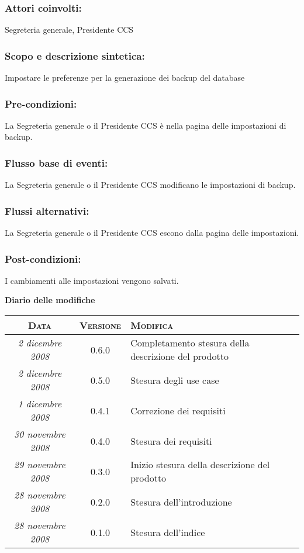 \documentclass[11pt,a4paper]{article}
\newcommand{\modifiche} 
{
\newpage
\begin{center}
\textbf{Diario delle modifiche} \\
\bigskip
\begin{tabular}{|c|c|p{0.51\textwidth}|}
\hline
\textsc{Data} & \textsc{Versione} & \textsc{Modifica} \\
\hline
\hline
\textit{2 dicembre 2008} & 0.6.0 & Completamento stesura della descrizione del prodotto \\
\hline
\textit{2 dicembre 2008} & 0.5.0 & Stesura degli use case \\
\hline
\textit{1 dicembre 2008} & 0.4.1 & Correzione dei requisiti \\
\hline
\textit{30 novembre 2008} & 0.4.0 & Stesura dei requisiti \\
\hline
\textit{29 novembre 2008} & 0.3.0 & Inizio stesura della descrizione del prodotto \\
\hline
\textit{28 novembre 2008} & 0.2.0 & Stesura dell'introduzione \\
\hline
\textit{28 novembre 2008} & 0.1.0 & Stesura dell'indice \\
\hline
\end{tabular}
\end{center}
}
\begin{document}
\subsubsection*{Attori coinvolti:}
Segreteria generale, Presidente CCS
\subsubsection*{Scopo e descrizione sintetica:}
Impostare le preferenze per la generazione dei backup del database
\subsubsection*{Pre-condizioni:}
La Segreteria generale o il Presidente CCS è nella pagina delle impostazioni di backup.
\subsubsection*{Flusso base di eventi:}
La Segreteria generale o il Presidente CCS modificano le impostazioni di backup.
\subsubsection*{Flussi alternativi:}
La Segreteria generale o il Presidente CCS escono dalla pagina delle impostazioni.
\subsubsection*{Post-condizioni:}
I cambiamenti alle impostazioni vengono salvati.
\modifiche
\end{document}
